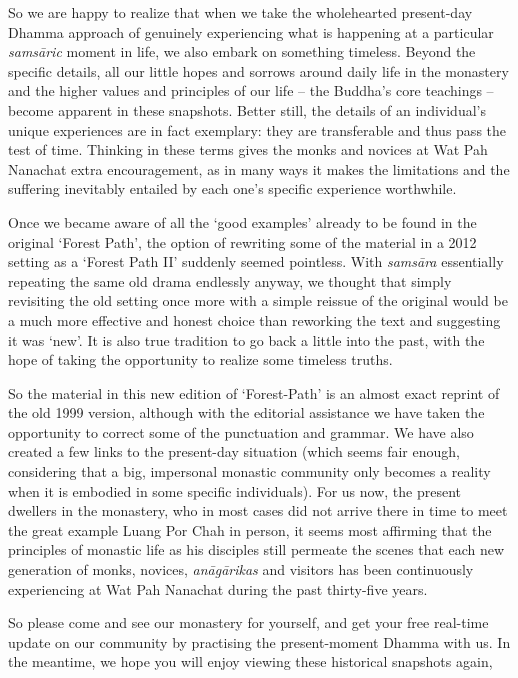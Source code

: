 So we are happy to realize that when we take the wholehearted
present-day Dhamma approach of genuinely experiencing what is happening
at a particular \emph{samsāric} moment in life, we also embark on
something timeless. Beyond the specific details, all our little hopes
and sorrows around daily life in the monastery and the higher values and
principles of our life -- the Buddha's core teachings -- become apparent
in these snapshots. Better still, the details of an individual's unique
experiences are in fact exemplary: they are transferable and thus pass
the test of time. Thinking in these terms gives the monks and novices at
Wat Pah Nanachat extra encouragement, as in many ways it makes the
limitations and the suffering inevitably entailed by each one's specific
experience worthwhile.

Once we became aware of all the `good examples' already to be found in
the original `Forest Path', the option of rewriting some of the material
in a 2012 setting as a `Forest Path II' suddenly seemed pointless. With
\emph{samsāra} essentially repeating the same old drama endlessly
anyway, we thought that simply revisiting the old setting once more with
a simple reissue of the original would be a much more effective and
honest choice than reworking the text and suggesting it was `new'. It is
also true tradition to go back a little into the past, with the hope of
taking the opportunity to realize some timeless truths.

So the material in this new edition of `Forest-Path' is an almost exact
reprint of the old 1999 version, although with the editorial assistance
we have taken the opportunity to correct some of the punctuation and
grammar. We have also created a few links to the present-day situation
(which seems fair enough, considering that a big, impersonal monastic
community only becomes a reality when it is embodied in some specific
individuals). For us now, the present dwellers in the monastery, who in
most cases did not arrive there in time to meet the great example Luang
Por Chah in person, it seems most affirming that the principles of
monastic life as his disciples still permeate the scenes that each new
generation of monks, novices, \emph{anāgārikas} and visitors has been
continuously experiencing at Wat Pah Nanachat during the past
thirty-five years.

So please come and see our monastery for yourself, and get your free
real-time update on our community by practising the present-moment
Dhamma with us. In the meantime, we hope you will enjoy viewing these
historical snapshots again,

